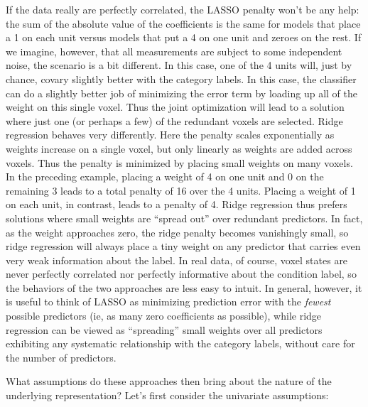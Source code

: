 If the data really are perfectly correlated, the LASSO penalty won't be any help: the sum of the absolute value of the coefficients is the same for models that place a 1 on each unit versus models that put a 4 on one unit and zeroes on the rest. If we imagine, however, that all measurements are subject to some independent noise, the scenario is a bit different. In this case, one of the 4 units will, just by chance, covary slightly better with the category labels. In this case, the classifier can do a slightly better job of minimizing the error term by loading up all of the weight on this single voxel. Thus the joint optimization will lead to a solution where just one (or perhaps a few) of the redundant voxels are selected. Ridge regression behaves very differently. Here the penalty scales exponentially as weights increase on a single voxel, but only linearly as weights are added across voxels. Thus the penalty is minimized by placing small weights on many voxels. In the preceding example, placing a weight of 4 on one unit and 0 on the remaining 3 leads to a total penalty of 16 over the 4 units. Placing a weight of 1 on each unit, in contrast, leads to a penalty of 4. Ridge regression thus prefers solutions where small weights are ``spread out'' over redundant predictors. In fact, as the weight approaches zero, the ridge penalty becomes vanishingly small, so ridge regression will always place a tiny weight on any predictor that carries even very weak information about the label. In real data, of course, voxel states are never perfectly correlated nor perfectly informative about the condition label, so the behaviors of the two approaches are less easy to intuit. In general, however, it is useful to think of LASSO as minimizing prediction error with the {\em fewest} possible predictors (ie, as many zero coefficients as possible), while ridge regression can be viewed as ``spreading'' small weights over all predictors exhibiting any systematic relationship with the category labels, without care for the number of predictors. 

What assumptions do these approaches then bring about the nature of the underlying representation? Let's first consider the univariate assumptions: 

